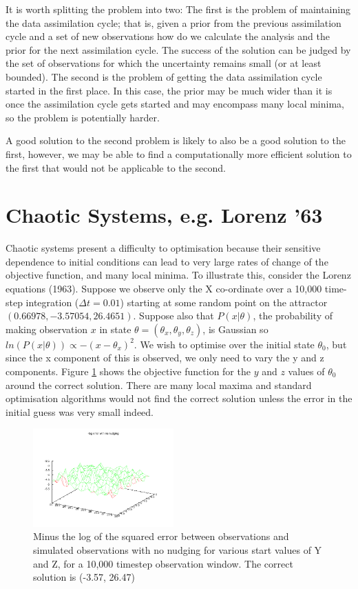 \documentclass[letterpaper,twocolumn,10pt]{article}
\begin{document}
It is worth splitting the problem into two: The first is the problem of maintaining the data assimilation cycle; that is, given a prior from the previous assimilation cycle and a set of new observations how do we calculate the analysis and the prior for the next assimilation cycle. The success of the solution can be judged by the set of observations for which the uncertainty remains small (or at least bounded). The second is the problem of getting the data assimilation cycle started in the first place. In this case, the prior may be much wider than it is once the assimilation cycle gets started and may encompass many local minima, so the problem is potentially harder.

A good solution to the second problem is likely to also be a good solution to the first, however, we may be able to find a computationally more efficient solution to the first that would not be applicable to the second.

\section{Chaotic Systems, e.g. Lorenz '63}

Chaotic systems present a difficulty to optimisation because their sensitive dependence to initial conditions can lead to very large rates of change of the objective function, and many local minima. To illustrate this, consider the Lorenz equations (1963). Suppose we observe only the X co-ordinate over a 10,000 time-step integration ($\Delta t=0.01$) starting at some random point on the attractor $(0.66978, -3.57054, 26.4651)$. Suppose also that $P(x|\theta)$, the probability of making observation $x$ in state $\theta=(\theta_x,\theta_y,\theta_z)$, is Gaussian so $ln(P(x|\theta)) \propto -(x-\theta_x)^2$. We wish to optimise over the initial state $\theta_0$, but since the x component of this is observed, we only need to vary the y and z components. Figure \ref{noNudging} shows the objective function for the $y$ and $z$ values of $\theta_0$ around the correct solution. There are many local maxima and standard optimisation algorithms would not find the correct solution unless the error in the initial guess was very small indeed.

\begin{figure}
\includegraphics[width=0.48\textwidth]{rawOut.pdf}
\caption{Minus the log of the squared error between observations and simulated observations with no nudging for various start values of Y and Z, for a 10,000 timestep observation window. The correct solution is (-3.57, 26.47)}
\label{noNudging}
\end{figure}
\end{document}
